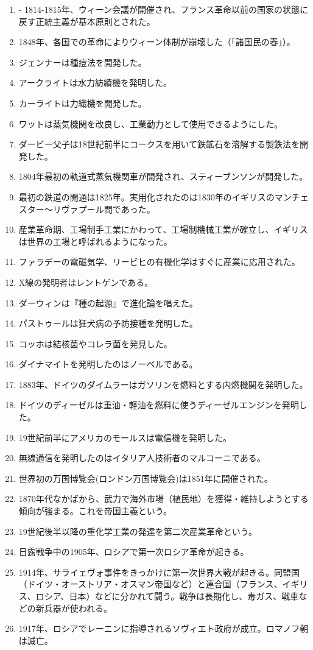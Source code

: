 \documentclass[twocolumn,autodetect-engine,dvipdfmx-if-dvi,ja=standard]{jsarticle} \usepackage{mystyle}
\begin{document}
\begin{enumerate}
\item - 1814-1815年、ウィーン会議が開催され、フランス革命以前の国家の状態に戻す正統主義が基本原則とされた。
\item 1848年、各国での革命によりウィーン体制が崩壊した（「諸国民の春」）。


\item ジェンナーは種痘法を開発した。
\item アークライトは水力紡績機を発明した。
\item カーライトは力織機を開発した。
\item ワットは蒸気機関を改良し、工業動力として使用できるようにした。
\item ダービー父子は18世紀前半にコークスを用いて鉄鉱石を溶解する製鉄法を開発した。
\item 1804年最初の軌道式蒸気機関車が開発され、スティーブンソンが開発した。
\item 最初の鉄道の開通は1825年。実用化されたのは1830年のイギリスのマンチェスター〜リヴァプール間であった。
\item 産業革命期、工場制手工業にかわって、工場制機械工業が確立し、イギリスは世界の工場と呼ばれるようになった。
\item ファラデーの電磁気学、リービヒの有機化学はすぐに産業に応用された。
\item X線の発明者はレントゲンである。
\item ダーウィンは『種の起源』で進化論を唱えた。
\item パストゥールは狂犬病の予防接種を発明した。
\item コッホは結核菌やコレラ菌を発見した。
\item ダイナマイトを発明したのはノーベルである。
\item 1883年、ドイツのダイムラーはガソリンを燃料とする内燃機関を発明した。
\item ドイツのディーゼルは重油・軽油を燃料に使うディーゼルエンジンを発明した。
\item 19世紀前半にアメリカのモールスは電信機を発明した。
\item 無線通信を発明したのはイタリア人技術者のマルコーニである。
\item 世界初の万国博覧会(ロンドン万国博覧会)は1851年に開催された。
\item 1870年代なかばから、武力で海外市場（植民地）を獲得・維持しようとする傾向が強まる。これを帝国主義という。
\item 19世紀後半以降の重化学工業の発達を第二次産業革命という。
\item 日露戦争中の1905年、ロシアで第一次ロシア革命が起きる。
\item 1914年、サライェヴォ事件をきっかけに第一次世界大戦が起きる。同盟国（ドイツ・オーストリア・オスマン帝国など）と連合国（フランス、イギリス、ロシア、日本）などに分かれて闘う。戦争は長期化し、毒ガス、戦車などの新兵器が使われる。
\item 1917年、ロシアでレーニンに指導されるソヴィエト政府が成立。ロマノフ朝は滅亡。


\end{enumerate}


\ifx\mybook\undefined
{}


\end{document}
